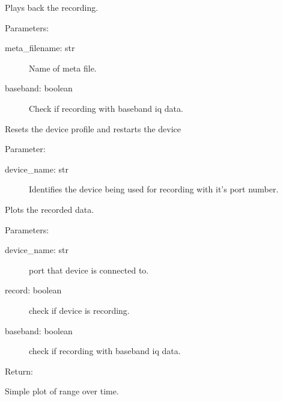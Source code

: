 \documentclass[letterpaper,10pt,english]{sphinxmanual}
\begin{document}
\begin{fulllineitems}
\label{\detokenize{X4 radar:X4_record_playback.playback_recording}}
Plays back the recording.

Parameters:
\begin{description}
\item[{meta\_filename: str}] \leavevmode
Name of meta file.

\item[{baseband: boolean}] \leavevmode
Check if recording with baseband iq data.

\end{description}

\end{fulllineitems}


\begin{fulllineitems}
\label{\detokenize{X4 radar:X4_record_playback.reset}}
Resets the device profile and restarts the device

Parameter:
\begin{description}
\item[{device\_name: str}] \leavevmode
Identifies the device being used for recording with it’s port number.

\end{description}

\end{fulllineitems}


\begin{fulllineitems}
\label{\detokenize{X4 radar:X4_record_playback.simple_xep_plot}}
Plots the recorded data.

Parameters:
\begin{description}
\item[{device\_name: str}] \leavevmode
port that device is connected to.

\item[{record: boolean}] \leavevmode
check if device is recording.

\item[{baseband: boolean}] \leavevmode
check if recording with baseband iq data.

\end{description}

Return:

Simple plot of range over time.

\end{fulllineitems}
\end{document}
